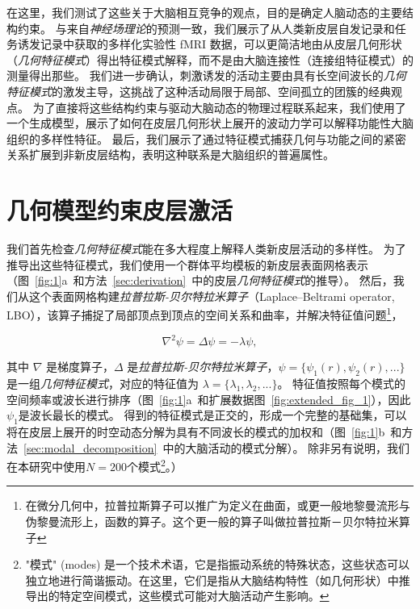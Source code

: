 \documentclass[lang=cn,a4paper,newtx,citestyle=gb7714-2015, bibstyle=gb7714-2015]{elegantpaper}
\begin{document}
在这里，我们测试了这些关于大脑相互竞争的观点，目的是确定人脑动态的主要结构约束。
与来自\textit{神经场理论}的预测一致，我们展示了从人类新皮层自发记录和任务诱发记录中获取的多样化实验性 fMRI 数据，可以更简洁地由从皮层几何形状（\textit{几何特征模式}）得出特征模式解释，而不是由大脑连接性（连接组特征模式）的测量得出那些。
我们进一步确认，刺激诱发的活动主要由具有长空间波长的\textit{几何特征模式}的激发主导，这挑战了这种活动局限于局部、空间孤立的团簇的经典观点。
为了直接将这些结构约束与驱动大脑动态的物理过程联系起来，我们使用了一个生成模型，展示了如何在皮层几何形状上展开的波动力学可以解释功能性大脑组织的多样性特征。
最后，我们展示了通过特征模式捕获几何与功能之间的紧密关系扩展到非新皮层结构，表明这种联系是大脑组织的普遍属性。


\section{几何模型约束皮层激活}
我们首先检查\textit{几何特征模式}能在多大程度上解释人类新皮层活动的多样性。
为了推导出这些特征模式，我们使用一个群体平均模板的新皮层表面网格表示（图~\ref{fig:1}a~和方法~\ref{sec:derivation}~中的皮层\textit{几何特征模式}的推导）。
然后，我们从这个表面网格构建\textit{拉普拉斯-贝尔特拉米算子}（Laplace–Beltrami operator, LBO），该算子捕捉了局部顶点到顶点的空间关系和曲率，并解决特征值问题\footnote{在微分几何中，拉普拉斯算子可以推广为定义在曲面，或更一般地黎曼流形与伪黎曼流形上，函数的算子。这个更一般的算子叫做拉普拉斯－贝尔特拉米算子}，

\begin{equation} \label{eq:1}
	\nabla^2 \psi = \Delta\psi = -\lambda \psi,
\end{equation}


其中 $ \nabla $ 是梯度算子，$ \Delta $ 是\textit{拉普拉斯-贝尔特拉米算子}，$ \psi = \{\psi_1(r), \psi_2(r),...\} $ 是一组\textit{几何特征模式}，对应的特征值为 $ \lambda = \{ \lambda_1, \lambda_2, ... \} $。
特征值按照每个模式的空间频率或波长进行排序（图~\ref{fig:1}a~和扩展数据图~\ref{fig:extended_fig_1}），因此$ \psi_1 $是波长最长的模式。
得到的特征模式是正交的，形成一个完整的基础集，可以将在皮层上展开的时空动态分解为具有不同波长的模式的加权和（图~\ref{fig:1}b~和方法~\ref{sec:modal_decomposition}~中的大脑活动的模式分解）。
除非另有说明，我们在本研究中使用$ N = 200 $个模式\footnote{"模式" (modes) 是一个技术术语，它是指振动系统的特殊状态，这些状态可以独立地进行简谐振动。在这里，它们是指从大脑结构特性（如几何形状）中推导出的特定空间模式，这些模式可能对大脑活动产生影响。}。）
\end{document}
